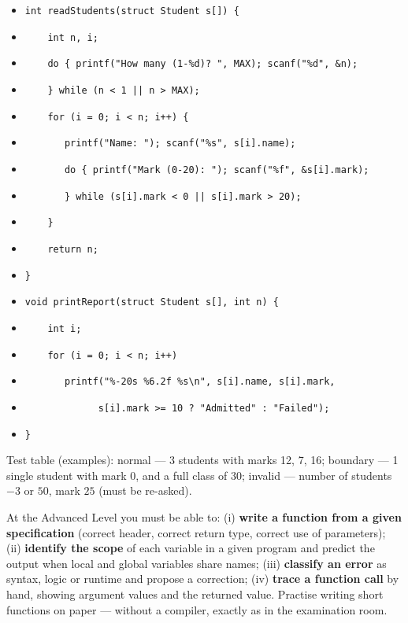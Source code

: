 \documentclass[11pt]{article}
\begin{document}
\begin{corrige}
\begin{itemize}
\item[] \texttt{int readStudents(struct Student s[]) \{}
\item[] \texttt{\ \ \ \ int n, i;}
\item[] \texttt{\ \ \ \ do \{ printf("How many (1-\%d)? ", MAX); scanf("\%d", \&n);}
\item[] \texttt{\ \ \ \ \} while (n < 1 || n > MAX);}
\item[] \texttt{\ \ \ \ for (i = 0; i < n; i++) \{}
\item[] \texttt{\ \ \ \ \ \ \ printf("Name: "); scanf("\%s", s[i].name);}
\item[] \texttt{\ \ \ \ \ \ \ do \{ printf("Mark (0-20): "); scanf("\%f", \&s[i].mark);}
\item[] \texttt{\ \ \ \ \ \ \ \} while (s[i].mark < 0 || s[i].mark > 20);}
\item[] \texttt{\ \ \ \ \}}
\item[] \texttt{\ \ \ \ return n;}
\item[] \texttt{\}}
\item[] \texttt{void printReport(struct Student s[], int n) \{}
\item[] \texttt{\ \ \ \ int i;}
\item[] \texttt{\ \ \ \ for (i = 0; i < n; i++)}
\item[] \texttt{\ \ \ \ \ \ \ printf("\%-20s \%6.2f  \%s\textbackslash n", s[i].name, s[i].mark,}
\item[] \texttt{\ \ \ \ \ \ \ \ \ \ \ \ \ s[i].mark >= 10 ? "Admitted" : "Failed");}
\item[] \texttt{\}}
\end{itemize}
Test table (examples): normal --- 3 students with marks 12, 7, 16; boundary --- 1 single student with mark 0, and a full class of 30; invalid --- number of students $-3$ or $50$, mark $25$ (must be re-asked).
\end{corrige}

\begin{attention}
At the Advanced Level you must be able to: (i) \textbf{write a function from a given specification} (correct header, correct return type, correct use of parameters); (ii) \textbf{identify the scope} of each variable in a given program and predict the output when local and global variables share names; (iii) \textbf{classify an error} as syntax, logic or runtime and propose a correction; (iv) \textbf{trace a function call} by hand, showing argument values and the returned value. Practise writing short functions on paper --- without a compiler, exactly as in the examination room.
\end{attention}
\end{document}
